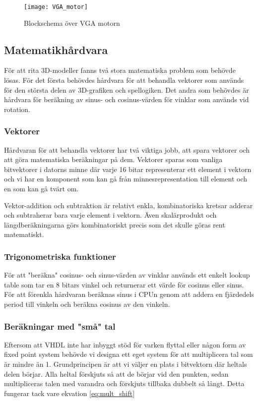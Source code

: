 \documentclass[a4paper]{article}
\begin{document}
    \begin{figure}[H]
        \centering
        \texttt{[image: VGA\_motor]}
        \caption{Blockschema över VGA motorn}
        \label{fig:VGA_motor}
    \end{figure}

    \subsection{Matematikhårdvara}
    För att rita 3D-modeller fanns två stora matematiska problem som behövde
    lösas. För det första behövdes hårdvara för att behandla vektorer som
    används för den största delen av 3D-grafiken och spellogiken. Det andra som
    behövdes är hårdvara för beräkning av sinus- och cosinus-värden för vinklar som
    används vid rotation.
    
    \subsubsection{Vektorer}
    Hårdvaran för att behandla vektorer har två viktiga jobb, att spara vektorer
    och att göra matematiska beräkningar på dem. Vektorer sparas som vanliga
    bitvektorer i datorns minne där varje 16 bitar representerar ett element i
    vektorn och vi har en komponent som kan gå från minnesrepresentation till
    element och en som kan gå tvärt om. 

    Vektor-addition och subtraktion är relativt enkla, kombinatoriska kretsar
    adderar och
    subtraherar bara varje element i vektorn. Även skalärprodukt och
    längdberäkningarna görs kombinatoriskt precis som det skulle göras rent
    matematiskt. 

    \subsubsection{Trigonometriska funktioner}
    För att "beräkna" cosinus- och sinus-värden av vinklar används ett enkelt lookup
    table som tar en 8 bitars vinkel och returnerar ett värde för cosinus eller
    sinus. För att förenkla hårdvaran beräknas sinus i CPUn genom att addera en
    fjärdedels period till vinkeln och beräkna cosinus av den vinkeln. 

    \subsubsection{Beräkningar med "små" tal}
    Eftersom att VHDL inte har inbyggt stöd för varken flyttal eller någon form
    av fixed point system behövde vi designa ett eget system för att
    multiplicera tal som är mindre än 1. Grundprincipen är att vi väljer en
    plats i bitvektorn där heltals delen börjar. Alla heltal förskjuts så att de
    börjar vid den punkten, sedan multipliceras talen med varandra och förskjuts
    tillbaka dubbelt så långt. Detta fungerar tack vare ekvation
    \ref{eq:mult_shift}
\end{document}
